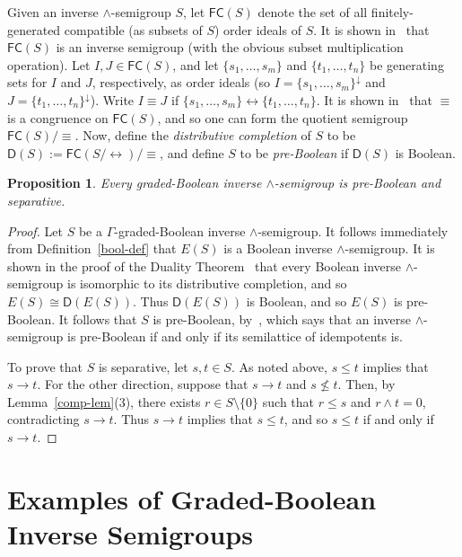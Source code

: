 \documentclass[a4paper,reqno,12pt]{amsart}
\numberwithin{equation}{section}
\theoremstyle{plain}
\newtheorem{prop}[thm]{Proposition}
\theoremstyle{definition}
\begin{document}
Given an inverse $\land$-semigroup $S$, let $\mathsf{FC}(S)$ denote the set of all finitely-generated compatible (as subsets of $S$) order ideals of $S$. It is shown in~\cite[Proposition 2.5]{Lawson3} that $\mathsf{FC}(S)$ is an inverse semigroup (with the obvious subset multiplication operation). Let $I, J \in \mathsf{FC}(S)$, and let $\{s_1, \dots, s_m\}$ and $\{t_1, \dots, t_n\}$ be generating sets for $I$ and $J$, respectively, as order ideals (so $I = \{s_1, \dots, s_m\}^{\downarrow}$ and $J = \{t_1, \dots, t_n\}^{\downarrow}$). Write $I \equiv J$ if $\{s_1, \dots, s_m\} \leftrightarrow \{t_1, \dots, t_n\}$. It is shown in~\cite[Lemma 2.14]{Lawson3} that $\equiv$ is a congruence on $\mathsf{FC}(S)$, and so one can form the quotient semigroup $\mathsf{FC}(S)/\equiv$. Now, define the \emph{distributive completion} of $S$ to be $\mathsf{D}(S) := \mathsf{FC}(S/\leftrightarrow)/\equiv$, and define $S$ to be \emph{pre-Boolean} if $\mathsf{D}(S)$ is Boolean.

\begin{prop} \label{pre-bool}
Every graded-Boolean inverse $\land$-semigroup is pre-Boolean and separative.
\end{prop}

\begin{proof}
Let $S$ be a $\Gamma$-graded-Boolean inverse $\land$-semigroup. It follows immediately from Definition~\ref{bool-def} that $E(S)$ is a Boolean inverse $\land$-semigroup. It is shown in the proof of the Duality Theorem~\cite[Section 2.4]{Lawson3} that every Boolean inverse $\land$-semigroup is isomorphic to its distributive completion, and so $E(S) \cong \mathsf{D}(E(S))$. Thus $\mathsf{D}(E(S))$ is Boolean, and so $E(S)$ is pre-Boolean. It follows that $S$ is pre-Boolean, by~\cite[Theorem 1.5(1)]{Lawson3}, which says that an inverse $\land$-semigroup is pre-Boolean if and only if its semilattice of idempotents is.

To prove that $S$ is separative, let $s,t \in S$. As noted above, $s \leq t$ implies that $s \to t$. For the other direction, suppose that $s \to t$ and $s \not\leq t$. Then, by Lemma~\ref{comp-lem}(3), there exists $r \in S\setminus \{0\}$ such that $r \leq s$ and $r\land t = 0$, contradicting $s \to t$. Thus $s \to t$ implies that $s \leq t$, and so $s \leq t$ if and only if $s \to t$.
\end{proof}

\section{Examples of Graded-Boolean Inverse Semigroups} \label{eg-sect}
\end{document}
